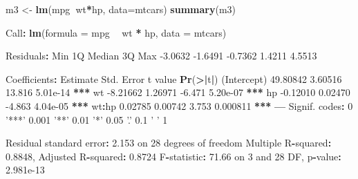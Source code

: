 \documentclass[]{article}
\newenvironment{Shaded}{\begin{snugshade}}{\end{snugshade}}
\newcommand{\DataTypeTok}[1]{\textcolor[rgb]{0.13,0.29,0.53}{#1}}
\newcommand{\DecValTok}[1]{\textcolor[rgb]{0.00,0.00,0.81}{#1}}
\newcommand{\ErrorTok}[1]{\textcolor[rgb]{0.64,0.00,0.00}{\textbf{#1}}}
\newcommand{\FloatTok}[1]{\textcolor[rgb]{0.00,0.00,0.81}{#1}}
\newcommand{\KeywordTok}[1]{\textcolor[rgb]{0.13,0.29,0.53}{\textbf{#1}}}
\newcommand{\NormalTok}[1]{#1}
\newcommand{\OperatorTok}[1]{\textcolor[rgb]{0.81,0.36,0.00}{\textbf{#1}}}
\newcommand{\StringTok}[1]{\textcolor[rgb]{0.31,0.60,0.02}{#1}}
\begin{document}
\begin{Shaded}
\begin{Highlighting}[]

\NormalTok{m3 <-}\StringTok{ }\KeywordTok{lm}\NormalTok{(mpg}\OperatorTok{~}\NormalTok{wt}\OperatorTok{*}\NormalTok{hp, }\DataTypeTok{data=}\NormalTok{mtcars)}
\KeywordTok{summary}\NormalTok{(m3)}

\NormalTok{Call}\OperatorTok{:}
\KeywordTok{lm}\NormalTok{(}\DataTypeTok{formula =}\NormalTok{ mpg }\OperatorTok{~}\StringTok{ }\NormalTok{wt }\OperatorTok{*}\StringTok{ }\NormalTok{hp, }\DataTypeTok{data =}\NormalTok{ mtcars)}

\NormalTok{Residuals}\OperatorTok{:}
\StringTok{    }\NormalTok{Min      1Q  Median      3Q     Max }
\FloatTok{-3.0632} \FloatTok{-1.6491} \FloatTok{-0.7362}  \FloatTok{1.4211}  \FloatTok{4.5513} 

\NormalTok{Coefficients}\OperatorTok{:}
\StringTok{            }\NormalTok{Estimate Std. Error t value }\KeywordTok{Pr}\NormalTok{(}\OperatorTok{>}\ErrorTok{|}\NormalTok{t}\OperatorTok{|}\NormalTok{)    }
\NormalTok{(Intercept) }\FloatTok{49.80842}    \FloatTok{3.60516}  \FloatTok{13.816} \FloatTok{5.01e-14} \OperatorTok{**}\ErrorTok{*}
\NormalTok{wt          }\FloatTok{-8.21662}    \FloatTok{1.26971}  \FloatTok{-6.471} \FloatTok{5.20e-07} \OperatorTok{**}\ErrorTok{*}
\NormalTok{hp          }\FloatTok{-0.12010}    \FloatTok{0.02470}  \FloatTok{-4.863} \FloatTok{4.04e-05} \OperatorTok{**}\ErrorTok{*}
\NormalTok{wt}\OperatorTok{:}\NormalTok{hp        }\FloatTok{0.02785}    \FloatTok{0.00742}   \FloatTok{3.753} \FloatTok{0.000811} \OperatorTok{**}\ErrorTok{*}
\OperatorTok{---}
\NormalTok{Signif. codes}\OperatorTok{:}\StringTok{  }\DecValTok{0} \StringTok{'***'} \FloatTok{0.001} \StringTok{'**'} \FloatTok{0.01} \StringTok{'*'} \FloatTok{0.05} \StringTok{'.'} \FloatTok{0.1} \StringTok{' '} \DecValTok{1}

\NormalTok{Residual standard error}\OperatorTok{:}\StringTok{ }\FloatTok{2.153}\NormalTok{ on }\DecValTok{28}\NormalTok{ degrees of freedom}
\NormalTok{Multiple R}\OperatorTok{-}\NormalTok{squared}\OperatorTok{:}\StringTok{  }\FloatTok{0.8848}\NormalTok{,    Adjusted R}\OperatorTok{-}\NormalTok{squared}\OperatorTok{:}\StringTok{  }\FloatTok{0.8724} 
\NormalTok{F}\OperatorTok{-}\NormalTok{statistic}\OperatorTok{:}\StringTok{ }\FloatTok{71.66}\NormalTok{ on }\DecValTok{3}\NormalTok{ and }\DecValTok{28}\NormalTok{ DF,  p}\OperatorTok{-}\NormalTok{value}\OperatorTok{:}\StringTok{ }\FloatTok{2.981e-13}
\end{Highlighting}
\end{Shaded}
\end{document}
